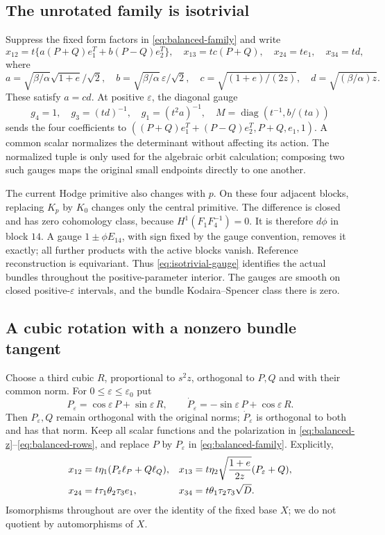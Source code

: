 \documentclass[11pt]{amsart}
\theoremstyle{definition}
\theoremstyle{remark}
\newcommand{\diag}{\operatorname{diag}}
\begin{document}
\subsection{The unrotated family is isotrivial}\label{subsec:isotrivial}
Suppress the fixed form factors in \eqref{eq:balanced-family} and write
\[
 x_{12}=t\{a(P+Q)e_1^T+b(P-Q)e_2^T\},\quad
 x_{13}=tc(P+Q),\quad x_{24}=te_1,\quad x_{34}=td,
\]
where
\[
 a=\sqrt{\beta/\alpha}\sqrt{1+e}/\sqrt2,\quad
 b=\sqrt{\beta/\alpha}\,\varepsilon/\sqrt2,\quad
 c=\sqrt{(1+e)/(2z)},\quad d=\sqrt{(\beta/\alpha)z}.
\]
These satisfy $a=cd$. At positive $\varepsilon$, the diagonal gauge
\begin{equation}\label{eq:isotrivial-gauge}
 g_4=1,\quad g_3=(td)^{-1},\quad g_1=(t^2a)^{-1},\quad
 M=\diag(t^{-1},b/(ta))
\end{equation}
sends the four coefficients to
$((P+Q)e_1^T+(P-Q)e_2^T,P+Q,e_1,1)$.
A common scalar normalizes the determinant without affecting its action.
The normalized tuple is only used for the algebraic orbit calculation;
composing two such gauges maps the original small endpoints directly
to one another.

The current Hodge primitive also changes with $p$. On these four
adjacent blocks, replacing $K_p$ by $K_0$ changes only the central
primitive. The difference is closed and has zero cohomology class,
because $H^1(F_1F_4^{-1})=0$. It is therefore $d\phi$ in block
$14$. A gauge $1\pm\phi E_{14}$, with sign fixed by the gauge
convention, removes it exactly; all further products with the active
blocks vanish. Reference reconstruction is equivariant. Thus
\eqref{eq:isotrivial-gauge} identifies the actual bundles throughout
the positive-parameter interior. The gauges are smooth on closed
positive-$\varepsilon$ intervals, and the bundle Kodaira--Spencer
class there is zero.

\subsection{A cubic rotation with a nonzero bundle tangent}
Choose a third cubic $R$, proportional to $s^2z$, orthogonal to $P,Q$
and with their common norm. For $0\le\varepsilon\le\varepsilon_0$
put
\begin{equation}\label{eq:cubic-rotation}
 P_\varepsilon=\cos\varepsilon\,P+\sin\varepsilon\,R,
 \qquad \dot P_\varepsilon=-\sin\varepsilon\,P+\cos\varepsilon\,R.
\end{equation}
Then $P_\varepsilon,Q$ remain orthogonal with the original norms;
$\dot P_\varepsilon$ is orthogonal to both and has that norm.
Keep all scalar functions and the polarization in
\eqref{eq:balanced-z}--\eqref{eq:balanced-rows}, and replace $P$ by
$P_\varepsilon$ in \eqref{eq:balanced-family}. Explicitly,
\begin{align}
 x_{12}&=t\eta_1(P_\varepsilon\ell_P+Q\ell_Q),&
 x_{13}&=t\eta_2\sqrt{\frac{1+e}{2z}}(P_\varepsilon+Q),\notag\\
 x_{24}&=t\tau_1\theta_2\tau_3e_1,&
 x_{34}&=t\theta_1\tau_2\tau_3\sqrt D.
 \label{eq:rotated-family}
\end{align}
Isomorphisms throughout are over the identity of the fixed base $X$;
we do not quotient by automorphisms of $X$.
\end{document}
